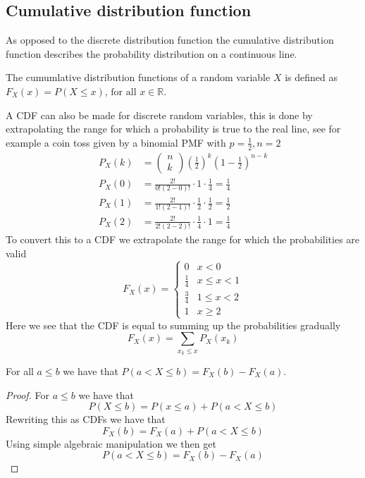 \subsection{Cumulative distribution function}
As opposed to the discrete distribution function the cumulative distribution function describes the probability distribution on a continuous line.
\begin{definition}
  The cumumlative distribution functions of a random variable $X$ is defined as $F_{X}(x)=P(X\leq x)\text{, for all } x\in \mathbb{R}$.
\end{definition}
A CDF can also be made for discrete random variables, this is done by extrapolating the range for which a probability is true to the real line, see for example a coin toss given by a binomial PMF with $p=\frac{1}{2},n=2$
\begin{align*}
    P_{X}(k)&=\begin{pmatrix}n\\k\end{pmatrix}\left(\frac{1}{2}\right)^{k}\left(1-\frac{1}{2}\right)^{n-k} \\
    P_{X}(0)&=\frac{2!}{0!(2-0)!}\cdot 1\cdot\frac{1}{4}=\frac{1}{4} \\
    P_{X}(1)&=\frac{2!}{1!(2-1)!}\cdot\frac{1}{2}\cdot\frac{1}{2}=\frac{1}{2} \\
    P_{X}(2)&=\frac{2!}{2!(2-2)!}\cdot\frac{1}{4}\cdot 1=\frac{1}{4}
\end{align*}
To convert this to a CDF we extrapolate the range for which the probabilities are valid
\[
    F_{X}(x)=\begin{cases}0 & x<0 \\ \frac{1}{4} & x\leq x<1 \\ \frac{3}{4} & 1\leq x<2 \\ 1 & x\geq 2 \end{cases}
\]
Here we see that the CDF is equal to summing up the probabilities gradually
\[
    F_{X}(x)=\sum_{x_{k}\leq x}P_{X}(x_{k})
\]
\begin{theorem}
  For all $a\leq b$ we have that $P(a<X\leq b)=F_{X}(b)-F_{X}(a)$.
\end{theorem}
\begin{proof}
    For $a\leq b$ we have that
    \[
        P(X\leq b)=P(x\leq a)+P(a<X\leq b)
    \]
    Rewriting this as CDFs we have that
    \[
        F_{X}(b)=F_{X}(a)+P(a<X\leq b)
    \]
    Using simple algebraic manipulation we then get
    \[
        P(a<X\leq b)=F_{X}(b)-F_{X}(a)
    \]
\end{proof}

